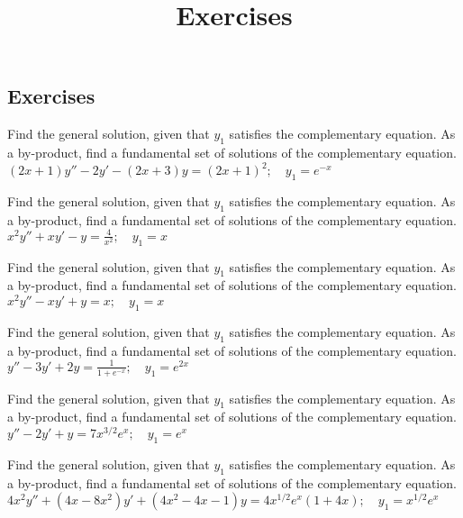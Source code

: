 \documentclass{ximera}
\title{Exercises} \license{CC BY-NC-SA 4.0}
\begin{document}
\begin{abstract}
\end{abstract}
\maketitle

\begin{onlineOnly}
\section*{Exercises}
\end{onlineOnly}


\begin{problem}\label{exer:5.6.1}
Find the general solution,
given that $y_1$ satisfies the complementary equation. As a by-product,
find a fundamental set of solutions of the complementary equation. $(2x+1)y''-2y'-(2x+3)y=(2x+1)^2;  \quad y_1=e^{-x}$
\end{problem}

\begin{problem}\label{exer:5.6.2}
Find the general solution,
given that $y_1$ satisfies the complementary equation. As a by-product,
find a fundamental set of solutions of the complementary equation. $x^2y''+xy'-y=\frac{4}{x^2};   \quad y_1=x$
\end{problem}

\begin{problem}\label{exer:5.6.3}
Find the general solution,
given that $y_1$ satisfies the complementary equation. As a by-product,
find a fundamental set of solutions of the complementary equation. $x^2y''-xy'+y=x;   \quad y_1=x$
\end{problem}

\begin{problem}\label{exer:5.6.4}
Find the general solution,
given that $y_1$ satisfies the complementary equation. As a by-product,
find a fundamental set of solutions of the complementary equation. $y''-3y'+2y=\frac{1}{1+e^{-x}};   \quad y_1=e^{2x}$
\end{problem}

\begin{problem}\label{exer:5.6.5}
Find the general solution,
given that $y_1$ satisfies the complementary equation. As a by-product,
find a fundamental set of solutions of the complementary equation. $y''-2y'+y=7x^{3/2}e^x;   \quad y_1=e^x$
\end{problem}

\begin{problem}\label{exer:5.6.6}
Find the general solution,
given that $y_1$ satisfies the complementary equation. As a by-product,
find a fundamental set of solutions of the complementary equation. $4x^2y''+(4x-8x^2)y'+(4x^2-4x-1)y=4x^{1/2}e^x(1+4x);   \quad
y_1=x^{1/2}e^x$
\end{problem}
\end{document}
